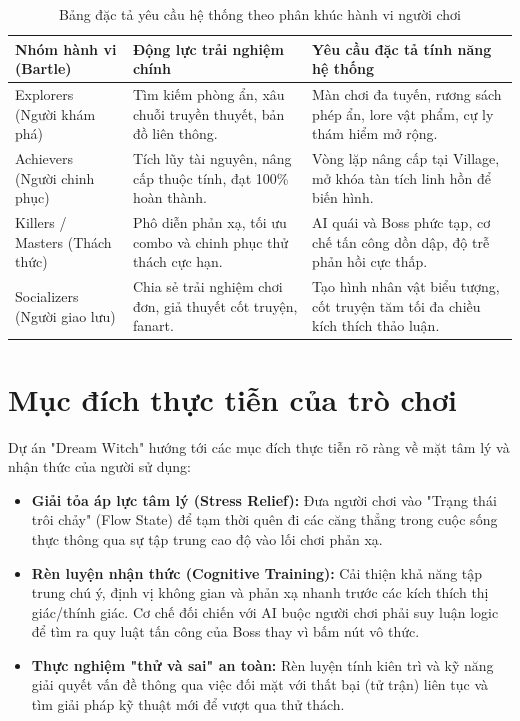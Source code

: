 \documentclass[../DoAn.tex]{subfiles}
\begin{document}
\begin{table}[H]
\centering
\begin{tabular}{|p{3cm}|p{4cm}|p{7cm}|}
\hline
\textbf{Nhóm hành vi (Bartle)} & \textbf{Động lực trải nghiệm chính} & \textbf{Yêu cầu đặc tả tính năng hệ thống} \\ \hline
Explorers (Người khám phá) & Tìm kiếm phòng ẩn, xâu chuỗi truyền thuyết, bản đồ liên thông. & Màn chơi đa tuyến, rương sách phép ẩn, lore vật phẩm, cự ly thám hiểm mở rộng. \\ \hline
Achievers (Người chinh phục) & Tích lũy tài nguyên, nâng cấp thuộc tính, đạt 100\% hoàn thành. & Vòng lặp nâng cấp tại Village, mở khóa tàn tích linh hồn để biến hình. \\ \hline
Killers / Masters (Thách thức) & Phô diễn phản xạ, tối ưu combo và chinh phục thử thách cực hạn. & AI quái và Boss phức tạp, cơ chế tấn công dồn dập, độ trễ phản hồi cực thấp. \\ \hline
Socializers (Người giao lưu) & Chia sẻ trải nghiệm chơi đơn, giả thuyết cốt truyện, fanart. & Tạo hình nhân vật biểu tượng, cốt truyện tăm tối đa chiều kích thích thảo luận. \\ \hline
\end{tabular}
\caption{Bảng đặc tả yêu cầu hệ thống theo phân khúc hành vi người chơi}
\label{table:player_motivation_requirements}
\end{table}

\section{Mục đích thực tiễn của trò chơi}
\label{section:2.4}

Dự án "Dream Witch" hướng tới các mục đích thực tiễn rõ ràng về mặt tâm lý và nhận thức của người sử dụng:
\begin{itemize}
    \item \textbf{Giải tỏa áp lực tâm lý (Stress Relief):} Đưa người chơi vào "Trạng thái trôi chảy" (Flow State) để tạm thời quên đi các căng thẳng trong cuộc sống thực thông qua sự tập trung cao độ vào lối chơi phản xạ.
    \item \textbf{Rèn luyện nhận thức (Cognitive Training):} Cải thiện khả năng tập trung chú ý, định vị không gian và phản xạ nhanh trước các kích thích thị giác/thính giác. Cơ chế đối chiến với AI buộc người chơi phải suy luận logic để tìm ra quy luật tấn công của Boss thay vì bấm nút vô thức.
    \item \textbf{Thực nghiệm "thử và sai" an toàn:} Rèn luyện tính kiên trì và kỹ năng giải quyết vấn đề thông qua việc đối mặt với thất bại (tử trận) liên tục và tìm giải pháp kỹ thuật mới để vượt qua thử thách.
\end{itemize}
\end{document}
